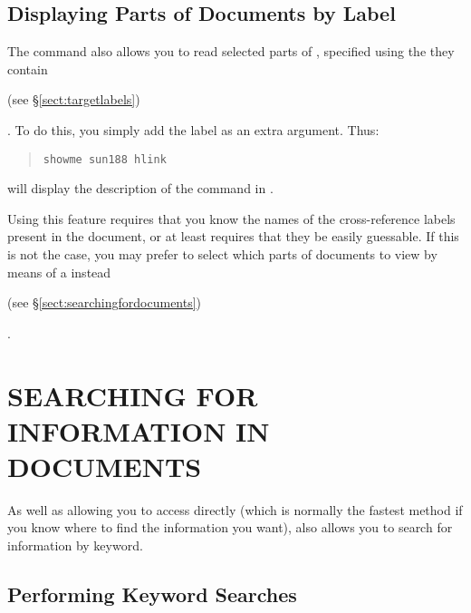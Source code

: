 \subsection{Displaying Parts of Documents by Label}

The  command also allows you to read selected
parts of , specified using
the  they
contain\begin{latexonly}
(see \S\ref{sect:targetlabels})
\end{latexonly}.
To do this, you simply add the label as an extra argument. Thus:

\begin{quote}
\begin{verbatim}
showme sun188 hlink
\end{verbatim}
\end{quote}

will display the description of the 
command in .

Using this feature requires that you know the names of the
cross-reference labels present in the document, or at least requires
that they be easily guessable. If this is not the case, you may prefer
to select which parts of documents to view by means of a
instead\begin{latexonly}
(see \S\ref{sect:searchingfordocuments})
\end{latexonly}.

\section{\label{sect:searchingfordocuments}SEARCHING FOR INFORMATION IN DOCUMENTS}

As well as allowing you to access
 directly  (which is normally the fastest method if
you know where to find the information you want),
 also allows you to search for information by
keyword.

\subsection{Performing Keyword Searches}

